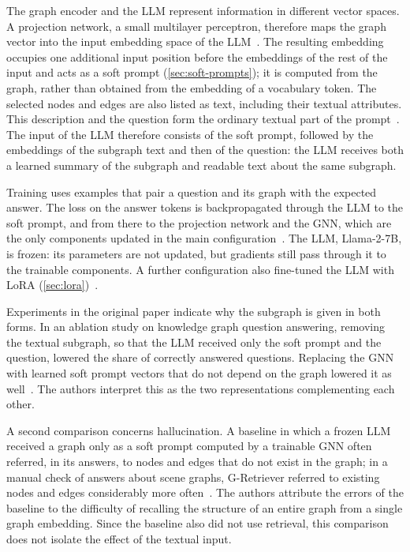 The graph encoder and the LLM represent information in different vector spaces. A projection network, a small multilayer perceptron, therefore maps the graph vector into the input embedding space of the LLM~\cite{he2024gretriever}. The resulting embedding occupies one additional input position before the embeddings of the rest of the input and acts as a soft prompt (\autoref{sec:soft-prompts}); it is computed from the graph, rather than obtained from the embedding of a vocabulary token. The selected nodes and edges are also listed as text, including their textual attributes. This description and the question form the ordinary textual part of the prompt~\cite{he2024gretriever}. The input of the LLM therefore consists of the soft prompt, followed by the embeddings of the subgraph text and then of the question: the LLM receives both a learned summary of the subgraph and readable text about the same subgraph.

Training uses examples that pair a question and its graph with the expected answer. The loss on the answer tokens is backpropagated through the LLM to the soft prompt, and from there to the projection network and the GNN, which are the only components updated in the main configuration~\cite{he2024gretriever}. The LLM, Llama-2-7B, is frozen: its parameters are not updated, but gradients still pass through it to the trainable components. A further configuration also fine-tuned the LLM with LoRA (\autoref{sec:lora})~\cite{he2024gretriever}.

Experiments in the original paper indicate why the subgraph is given in both forms. In an ablation study on knowledge graph question answering, removing the textual subgraph, so that the LLM received only the soft prompt and the question, lowered the share of correctly answered questions. Replacing the GNN with learned soft prompt vectors that do not depend on the graph lowered it as well~\cite{he2024gretriever}. The authors interpret this as the two representations complementing each other.

A second comparison concerns hallucination. A baseline in which a frozen LLM received a graph only as a soft prompt computed by a trainable GNN often referred, in its answers, to nodes and edges that do not exist in the graph; in a manual check of answers about scene graphs, G-Retriever referred to existing nodes and edges considerably more often~\cite{he2024gretriever}. The authors attribute the errors of the baseline to the difficulty of recalling the structure of an entire graph from a single graph embedding. Since the baseline also did not use retrieval, this comparison does not isolate the effect of the textual input.

